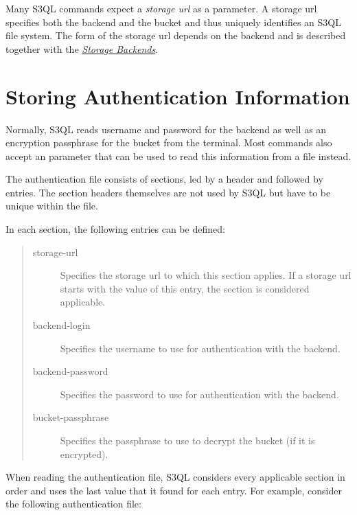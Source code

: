 \documentclass[letterpaper,10pt,english]{sphinxmanual}
\begin{document}
Many S3QL commands expect a \emph{storage url} as a parameter. A storage
url specifies both the backend and the bucket and thus uniquely
identifies an S3QL file system. The form of the storage url depends on
the backend and is described together with the
{\hyperref[backends:storage-backends]{\emph{Storage Backends}}}.


\section{Storing Authentication Information}
\label{general:storing-authentication-information}\label{general:bucket-pw}
Normally, S3QL reads username and password for the backend as well as
an encryption passphrase for the bucket from the terminal. Most
commands also accept an  parameter that can be
used to read this information from a file instead.

The authentication file consists of sections, led by a \code{{[}section{]}}
header and followed by  entries. The section headers
themselves are not used by S3QL but have to be unique within the file.

In each section, the following entries can be defined:
\begin{quote}\begin{description}
\item[{storage-url}] \leavevmode
Specifies the storage url to which this section applies. If a
storage url starts with the value of this entry, the section is
considered applicable.

\item[{backend-login}] \leavevmode
Specifies the username to use for authentication with the backend.

\item[{backend-password}] \leavevmode
Specifies the password to use for authentication with the backend.

\item[{bucket-passphrase}] \leavevmode
Specifies the passphrase to use to decrypt the bucket (if it is
encrypted).

\end{description}\end{quote}

When reading the authentication file, S3QL considers every applicable
section in order and uses the last value that it found for each entry.
For example, consider the following authentication file:
\end{document}
